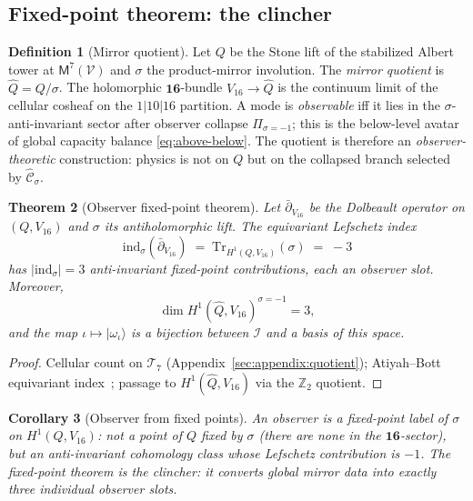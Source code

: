 \documentclass[aps,prd,onecolumn,amsmath,amssymb,nofootinbib,11pt]{revtex4-2}
\numberwithin{equation}{section}
\theoremstyle{plain}
\newtheorem{theorem}{Theorem}[section]
\newtheorem{corollary}[theorem]{Corollary}
\theoremstyle{definition}
\newtheorem{definition}[theorem]{Definition}
\theoremstyle{remark}
\newcommand{\Void}{\mathcal{V}}
\newcommand{\Mirror}{\mathsf{M}}
\begin{document}
\subsection{Fixed-point theorem: the clincher}
\label{sec:observer:fixed-point}

\begin{definition}[Mirror quotient]\label{def:Qhat}
Let $Q$ be the Stone lift of the stabilized Albert tower at
$\Mirror^7(\Void)$ and $\sigma$ the product-mirror involution. The
\emph{mirror quotient} is $\hat Q=Q/\sigma$. The holomorphic
$\mathbf{16}$-bundle $V_{16}\to\hat Q$ is the continuum limit of the
cellular cosheaf on the $1|10|16$ partition. A mode is \emph{observable}
iff it lies in the $\sigma$-anti-invariant sector after observer collapse
$\Pi_{\sigma=-1}$; this is the below-level avatar of global capacity balance
\eqref{eq:above-below}. The quotient is therefore an \emph{observer-theoretic}
construction: physics is not on $Q$ but on the collapsed branch selected by
$\hat{\mathcal{C}}_\sigma$.
\end{definition}

\begin{theorem}[Observer fixed-point theorem]\label{thm:observer-fp}
Let $\bar\partial_{V_{16}}$ be the Dolbeault operator on $(Q,V_{16})$ and
$\sigma$ its antiholomorphic lift. The equivariant Lefschetz index
\begin{equation}\label{eq:lefschetz}
  \mathrm{ind}_\sigma(\bar\partial_{V_{16}})
  \;=\;
  \mathrm{Tr}_{H^1(Q,V_{16})}(\sigma)
  \;=\; -3
\end{equation}
has $|\mathrm{ind}_\sigma|=3$ anti-invariant fixed-point contributions, each
an observer slot. Moreover,
\begin{equation}\label{eq:h1-observer}
  \dim H^1(\hat Q,V_{16})^{\sigma=-1}=3,
\end{equation}
and the map $\iota\mapsto|\omega_\iota\rangle$ is a bijection between
$\mathcal{I}$ and a basis of this space.
\end{theorem}

\begin{proof}
Cellular count on $\mathcal{T}_7$ (Appendix~\ref{sec:appendix:quotient});
Atiyah--Bott equivariant index~\cite{AtiyahBott1966}; passage to
$H^1(\hat Q,V_{16})$ via the $\mathbb{Z}_2$ quotient.
\end{proof}

\begin{corollary}[Observer from fixed points]\label{cor:observer-fp}
An observer is a \emph{fixed-point label} of $\sigma$ on $H^1(Q,V_{16})$:
not a point of $Q$ fixed by $\sigma$ (there are none in the
$\mathbf{16}$-sector), but an anti-invariant cohomology class whose
Lefschetz contribution is $-1$. The fixed-point theorem is the clincher:
it converts global mirror data into exactly three individual observer slots.
\end{corollary}
\end{document}
